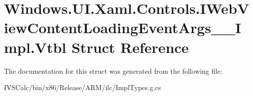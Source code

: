 \hypertarget{struct_windows_1_1_u_i_1_1_xaml_1_1_controls_1_1_i_web_view_content_loading_event_args_____impl_1_1_vtbl}{}\section{Windows.\+U\+I.\+Xaml.\+Controls.\+I\+Web\+View\+Content\+Loading\+Event\+Args\+\_\+\+\_\+\+Impl.\+Vtbl Struct Reference}
\label{struct_windows_1_1_u_i_1_1_xaml_1_1_controls_1_1_i_web_view_content_loading_event_args_____impl_1_1_vtbl}


The documentation for this struct was generated from the following file\+:\begin{DoxyCompactItemize}
\item 
I\+V\+S\+Calc/bin/x86/\+Release/\+A\+R\+M/ilc/Impl\+Types.\+g.\+cs\end{DoxyCompactItemize}
